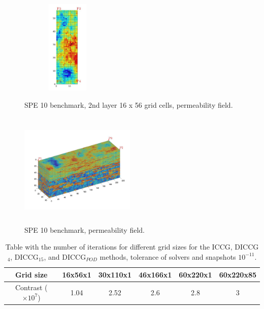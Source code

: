 \documentclass[12pt]{article}
\begin{document}
\begin{figure}[!h]
\centering
\begin{minipage}{.4\textwidth}
 \centering
\includegraphics[width=4.5cm,height=4.5cm,keepaspectratio]
{images_prev/perm_layer_2.jpg}
\caption{SPE 10 benchmark, 2nd layer 16 x 56 grid cells, permeability field.}
\label{fig:permc}
\end{minipage}%
\hspace{4mm}
\begin{minipage}{.4\textwidth}
 \centering
\includegraphics[width=5.5cm,height=5.5cm,keepaspectratio]
{images_prev/perm_layer_.jpg}
\caption{SPE 10 benchmark, permeability field.}
\label{fig:permcc}
\end{minipage}
\end{figure}


\begin{table}[!ht]
\centering
\begin{tabular}{ |c|c|c|c|c|c|  } 
 \hline
  Grid size & 16x56x1& 30x110x1& 46x166x1& 60x220x1&60x220x85\\
  \hline
  Contrast ($\times10^{7}$) & 1.04 & 2.52&  2.6&  2.8 &3\\ 
\hline
\end{tabular}
\caption{Table with the number of iterations for different grid sizes
for the ICCG, DICCG$_4$, DICCG$_{15}$, and DICCG$_{POD}$ methods, tolerance of solvers and snapshots $10^{-11}$.}
\label{table:permgs}
\end{table}
\end{document}
